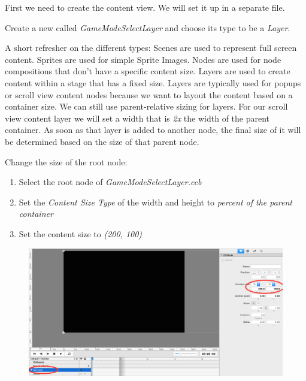 First we need to create the content view. We will set it up in a separate
\ccbfile{} file. 
\begin{leftbar}
Create a new \ccbfile{} called \textit{GameModeSelectLayer} and choose its type
to be a \textit{Layer}.
\end{leftbar}

\begin{details}
A short refresher on the different \ccbfile{} types: Scenes are used to
represent full screen content. Sprites are used for simple Sprite Images. Nodes
are used for node compositions that don't have a specific content size. Layers
are used to create content within a stage that has a fixed size.
Layers are typically used for popups or scroll view content nodes because we
want to layout the content based on a container size. We can still use
parent-relative sizing for layers. For our scroll view content layer we will set
a width that is \textit{2x} the width of the parent container. As soon as that
layer is added to another node, the final size of it will be determined based on
the size of that parent node.
\end{details}

\begin{leftbar}
Change the size of the root node:
\begin{enumerate}
  \item Select the root node of \textit{GameModeSelectLayer.ccb}
  \item Set the \textit{Content Size Type} of the width and height to  
  \textit{percent of the parent container}
  \item Set the content size to \textit{(200, 100)}
\end{enumerate}
\begin{figure}[H]
		\centering
		\includegraphics[width=0.85\linewidth]{images/Chapter7/content_node_width.png}
\end{figure}
\end{leftbar}

